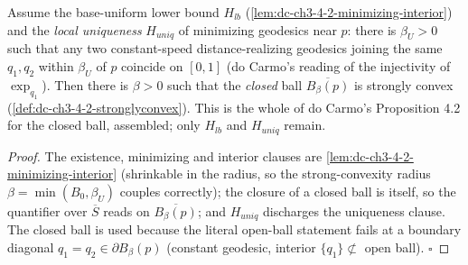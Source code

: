 \begin{lemma}
  \label{lem:dc-ch3-4-2-stronglyconvex-reduction}
  \leanok
  Assume the base-uniform lower bound $H_{lb}$ (\cref{lem:dc-ch3-4-2-minimizing-interior}) and the
  \emph{local uniqueness} $H_{uniq}$ of minimizing geodesics near $p$: there is $\beta_U>0$ such that
  any two constant-speed distance-realizing geodesics joining the same $q_1,q_2$ within $\beta_U$ of
  $p$ coincide on $[0,1]$ (do Carmo's reading of the injectivity of $\exp_{q_1}$). Then there is
  $\beta>0$ such that the \emph{closed} ball $\overline{B_\beta(p)}$ is strongly convex
  (\cref{def:dc-ch3-4-2-stronglyconvex}). This is the whole of do Carmo's Proposition 4.2 for the
  closed ball, assembled; only $H_{lb}$ and $H_{uniq}$ remain.
\end{lemma}
\begin{proof}
  \leanok
  The existence, minimizing and interior clauses are \cref{lem:dc-ch3-4-2-minimizing-interior}
  (shrinkable in the radius, so the strong-convexity radius $\beta=\min(B_0,\beta_U)$ couples
  correctly); the closure of a closed ball is itself, so the quantifier over $\overline{S}$ reads on
  $\overline{B_\beta(p)}$; and $H_{uniq}$ discharges the uniqueness clause. The closed ball is used
  because the literal open-ball statement fails at a boundary diagonal $q_1=q_2\in\partial B_\beta(p)$
  (constant geodesic, interior $\{q_1\}\not\subset$ open ball). $\square$
\end{proof}


